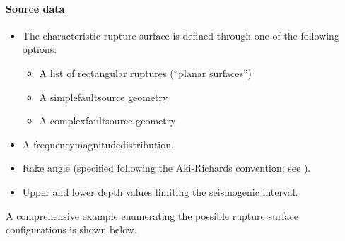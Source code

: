 \paragraph{Source data}
\begin{itemize}
    \item The characteristic rupture surface is defined through one of the
    following options:
        \begin{itemize}
            \item A list of rectangular ruptures (``planar surfaces'')
            \item A \gls{simplefaultsource} geometry
            \item A \gls{complexfaultsource} geometry
        \end{itemize}
    \item A \gls{frequencymagnitudedistribution}.
    \item Rake angle (specified following the Aki-Richards convention; see
          \citet{aki2002}).
    \item Upper and lower depth values limiting the seismogenic interval.
\end{itemize}

A comprehensive example enumerating the possible rupture surface configurations is shown below. 

\inputminted[firstline=1,firstnumber=1,fontsize=\footnotesize,frame=single,linenos,bgcolor=lightgray]{xml}{oqum/hazard/verbatim/input_characteristic_fault_simple.xml}

\inputminted[firstline=1,firstnumber=1,fontsize=\footnotesize,frame=single,linenos,bgcolor=lightgray]{xml}{oqum/hazard/verbatim/input_characteristic_fault_complex.xml}

\inputminted[firstline=1,firstnumber=1,fontsize=\footnotesize,frame=single,linenos,bgcolor=lightgray]{xml}{oqum/hazard/verbatim/input_characteristic_fault_planar.xml}



%

